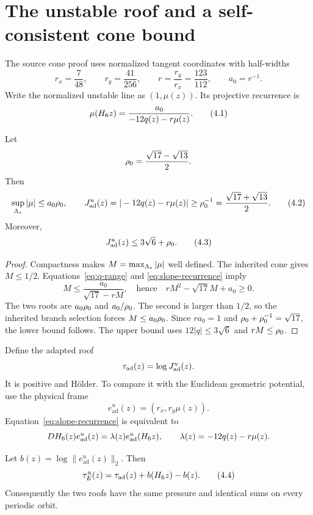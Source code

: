 \section{The unstable roof and a self-consistent cone bound}
\label{sec:roof}

The source cone proof uses normalized tangent coordinates with half-widths
\[
 r_x=\frac7{48},\qquad r_y=\frac{41}{256},
 \qquad r=\frac{r_y}{r_x}=\frac{123}{112},
 \qquad a_0=r^{-1}.
\]
Write the normalized unstable line as \((1,\mu(z))\).  Its projective
recurrence is
\[
 \mu(H_6 z)=\frac{a_0}{-12q(z)-r\mu(z)}.
 \tag{4.1}\label{eq:slope-recurrence}
\]

\begin{lemma}
\label{lem:cone}
Let
\[
 \rho_0=\frac{\sqrt{17}-\sqrt{13}}2.
\]
Then
\[
 \sup_{\Lambda_*}|\mu|
 \le a_0\rho_0,
 \qquad
 J^u_{\mathrm{ad}}(z)=|-12q(z)-r\mu(z)|
 \ge \rho_0^{-1}
 =\frac{\sqrt{17}+\sqrt{13}}2.
 \tag{4.2}\label{eq:cone-sharpening}
\]
Moreover,
\[
 J^u_{\mathrm{ad}}(z)\le 3\sqrt6+\rho_0.
 \tag{4.3}\label{eq:j-upper}
\]
\end{lemma}

\begin{proof}
Compactness makes \(M=\max_{\Lambda_*}|\mu|\) well defined.  The inherited cone
gives \(M\le1/2\).  Equations~\eqref{eq:q-range} and
\eqref{eq:slope-recurrence} imply
\[
 M\le \frac{a_0}{\sqrt{17}-rM},
 \quad\text{hence}\quad
 rM^2-\sqrt{17}M+a_0\ge0.
\]
The two roots are \(a_0\rho_0\) and \(a_0/\rho_0\).  The second is larger
than \(1/2\), so the inherited branch selection forces
\(M\le a_0\rho_0\).  Since \(ra_0=1\) and
\(\rho_0+\rho_0^{-1}=\sqrt{17}\), the lower bound follows.  The upper bound
uses \(12|q|\le3\sqrt6\) and \(rM\le\rho_0\).
\end{proof}

Define the adapted roof
\[
 \tau_{\mathrm{ad}}(z)=\log J^u_{\mathrm{ad}}(z).
\]
It is positive and H\"older.  To compare it with the Euclidean geometric
potential, use the physical frame
\[
 e^u_{\mathrm{ad}}(z)=(r_x,r_y\mu(z)).
\]
Equation~\eqref{eq:slope-recurrence} is equivalent to
\[
 DH_6(z)e^u_{\mathrm{ad}}(z)
 =\lambda(z)e^u_{\mathrm{ad}}(H_6 z),
 \qquad \lambda(z)=-12q(z)-r\mu(z).
\]

\begin{proposition}
\label{prop:coboundary}
Let \(b(z)=\log\|e^u_{\mathrm{ad}}(z)\|_2\).  Then
\[
 \tau_E^u(z)=\tau_{\mathrm{ad}}(z)+b(H_6 z)-b(z).
 \tag{4.4}\label{eq:roof-coboundary}
\]
Consequently the two roofs have the same pressure and identical sums on every
periodic orbit.
\end{proposition}

